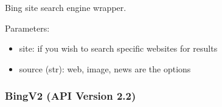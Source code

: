\documentclass[letterpaper,10pt,english]{sphinxmanual}
\begin{document}
\begin{fulllineitems}
\label{api2.0:puppy.search.engine.BingSite}
Bing site search engine wrapper.

Parameters:
\begin{itemize}
\item {} 
site: if you wish to search specific websites for results

\item {} 
source (str): web, image, news are the options

\end{itemize}

\end{fulllineitems}



\subsubsection{BingV2 (API Version 2.2)}
\label{api2.0:bingv2-api-version-2-2}
\end{document}
